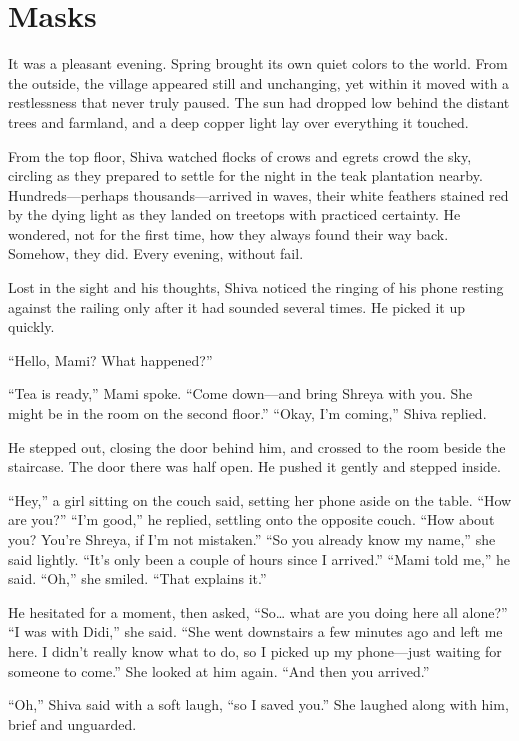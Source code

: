 \chapter{Masks}
It was a pleasant evening. Spring brought its own quiet colors to the world. From the outside, the village appeared still and unchanging, yet within it moved with a restlessness that never truly paused. The sun had dropped low behind the distant trees and farmland, and a deep copper light lay over everything it touched.

From the top floor, Shiva watched flocks of crows and egrets crowd the sky, circling as they prepared to settle for the night in the teak plantation nearby. Hundreds—perhaps thousands—arrived in waves, their white feathers stained red by the dying light as they landed on treetops with practiced certainty. He wondered, not for the first time, how they always found their way back. Somehow, they did. Every evening, without fail.

Lost in the sight and his thoughts, Shiva noticed the ringing of his phone resting against the railing only after it had sounded several times. He picked it up quickly.

``Hello, Mami? What happened?''

``Tea is ready,'' Mami spoke. ``Come down—and bring Shreya with you. She might be in the room on the second floor.''
``Okay, I'm coming,'' Shiva replied.

He stepped out, closing the door behind him, and crossed to the room beside the staircase. The door there was half open. He pushed it gently and stepped inside.

``Hey,'' a girl sitting on the couch said, setting her phone aside on the table. ``How are you?''
``I'm good,'' he replied, settling onto the opposite couch. ``How about you? You're Shreya, if I'm not mistaken.''
``So you already know my name,'' she said lightly. ``It's only been a couple of hours since I arrived.''
``Mami told me,'' he said.
``Oh,'' she smiled. ``That explains it.''

He hesitated for a moment, then asked, ``So… what are you doing here all alone?''
``I was with Didi,'' she said. ``She went downstairs a few minutes ago and left me here. I didn't really know what to do, so I picked up my phone—just waiting for someone to come.'' She looked at him again. ``And then you arrived.''

``Oh,'' Shiva said with a soft laugh, ``so I saved you.'' She laughed along with him, brief and unguarded.

